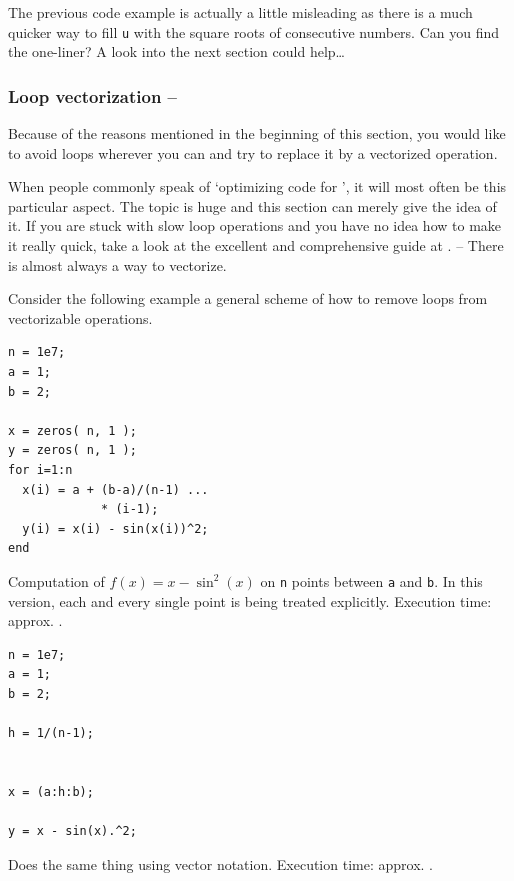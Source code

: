 \begin{remark}
The previous code example is actually a little misleading as there is a much quicker way to fill \lstinline!u! with the square roots of consecutive numbers. Can you find the one-liner? A look into the next section could help\dots
\end{remark}


\subsubsection{Loop vectorization -- \fastsymbol\fastsymbol\fastsymbol\fastsymbol\fastsymbol}

Because of the reasons mentioned in the beginning of this section, you would like to avoid loops wherever you can and try to replace it by a vectorized operation.

When people commonly speak of `optimizing code for \matlab{}', it will most often be this particular aspect. The topic is huge and this section can merely give the idea of it. If you are stuck with slow loop operations and you have no idea how to make it really quick, take a look at the excellent and comprehensive guide at \cite{Mathworks:2009:CVG}. -- There is almost always a way to vectorize.

Consider the following example a general scheme of how to remove loops from vectorizable operations.

\hfill
\begin{minipage}[t]{.45\textwidth}
\begin{lstlisting}[framerule=2pt,rulecolor=\color{badred}]
n = 1e7;
a = 1;
b = 2;

x = zeros( n, 1 );
y = zeros( n, 1 );
for i=1:n
  x(i) = a + (b-a)/(n-1) ...
             * (i-1);
  y(i) = x(i) - sin(x(i))^2;
end
\end{lstlisting}
Computation of $f(x)=x-\sin^2(x)$ on \lstinline!n! points between \lstinline!a! and \lstinline!b!. In this version, each and every single point is being treated explicitly. Execution time: approx. .
\end{minipage}
\hfill
\begin{minipage}[t]{.45\textwidth}
\begin{lstlisting}[framerule=2pt,rulecolor=\color{goodgreen}]
n = 1e7;
a = 1;
b = 2;

h = 1/(n-1);


x = (a:h:b);

y = x - sin(x).^2;

\end{lstlisting}
Does the same thing using vector notation. Execution time: approx. .
\end{minipage}
\hfill


